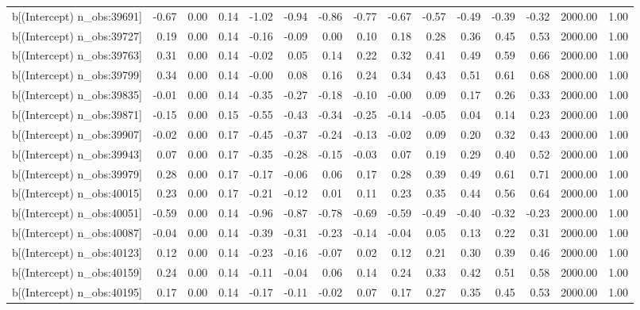 \begin{table}[ht]
\begin{tabular}{rrrrrrrrrrrrrrr}
  b[(Intercept) n\_obs:39691] & -0.67 & 0.00 & 0.14 & -1.02 & -0.94 & -0.86 & -0.77 & -0.67 & -0.57 & -0.49 & -0.39 & -0.32 & 2000.00 & 1.00 \\ 
  b[(Intercept) n\_obs:39727] & 0.19 & 0.00 & 0.14 & -0.16 & -0.09 & 0.00 & 0.10 & 0.18 & 0.28 & 0.36 & 0.45 & 0.53 & 2000.00 & 1.00 \\ 
  b[(Intercept) n\_obs:39763] & 0.31 & 0.00 & 0.14 & -0.02 & 0.05 & 0.14 & 0.22 & 0.32 & 0.41 & 0.49 & 0.59 & 0.66 & 2000.00 & 1.00 \\ 
  b[(Intercept) n\_obs:39799] & 0.34 & 0.00 & 0.14 & -0.00 & 0.08 & 0.16 & 0.24 & 0.34 & 0.43 & 0.51 & 0.61 & 0.68 & 2000.00 & 1.00 \\ 
  b[(Intercept) n\_obs:39835] & -0.01 & 0.00 & 0.14 & -0.35 & -0.27 & -0.18 & -0.10 & -0.00 & 0.09 & 0.17 & 0.26 & 0.33 & 2000.00 & 1.00 \\ 
  b[(Intercept) n\_obs:39871] & -0.15 & 0.00 & 0.15 & -0.55 & -0.43 & -0.34 & -0.25 & -0.14 & -0.05 & 0.04 & 0.14 & 0.23 & 2000.00 & 1.00 \\ 
  b[(Intercept) n\_obs:39907] & -0.02 & 0.00 & 0.17 & -0.45 & -0.37 & -0.24 & -0.13 & -0.02 & 0.09 & 0.20 & 0.32 & 0.43 & 2000.00 & 1.00 \\ 
  b[(Intercept) n\_obs:39943] & 0.07 & 0.00 & 0.17 & -0.35 & -0.28 & -0.15 & -0.03 & 0.07 & 0.19 & 0.29 & 0.40 & 0.52 & 2000.00 & 1.00 \\ 
  b[(Intercept) n\_obs:39979] & 0.28 & 0.00 & 0.17 & -0.17 & -0.06 & 0.06 & 0.17 & 0.28 & 0.39 & 0.49 & 0.61 & 0.71 & 2000.00 & 1.00 \\ 
  b[(Intercept) n\_obs:40015] & 0.23 & 0.00 & 0.17 & -0.21 & -0.12 & 0.01 & 0.11 & 0.23 & 0.35 & 0.44 & 0.56 & 0.64 & 2000.00 & 1.00 \\ 
  b[(Intercept) n\_obs:40051] & -0.59 & 0.00 & 0.14 & -0.96 & -0.87 & -0.78 & -0.69 & -0.59 & -0.49 & -0.40 & -0.32 & -0.23 & 2000.00 & 1.00 \\ 
  b[(Intercept) n\_obs:40087] & -0.04 & 0.00 & 0.14 & -0.39 & -0.31 & -0.23 & -0.14 & -0.04 & 0.05 & 0.13 & 0.22 & 0.31 & 2000.00 & 1.00 \\ 
  b[(Intercept) n\_obs:40123] & 0.12 & 0.00 & 0.14 & -0.23 & -0.16 & -0.07 & 0.02 & 0.12 & 0.21 & 0.30 & 0.39 & 0.46 & 2000.00 & 1.00 \\ 
  b[(Intercept) n\_obs:40159] & 0.24 & 0.00 & 0.14 & -0.11 & -0.04 & 0.06 & 0.14 & 0.24 & 0.33 & 0.42 & 0.51 & 0.58 & 2000.00 & 1.00 \\ 
  b[(Intercept) n\_obs:40195] & 0.17 & 0.00 & 0.14 & -0.17 & -0.11 & -0.02 & 0.07 & 0.17 & 0.27 & 0.35 & 0.45 & 0.53 & 2000.00 & 1.00 \\ 

\end{tabular}
\end{table}
